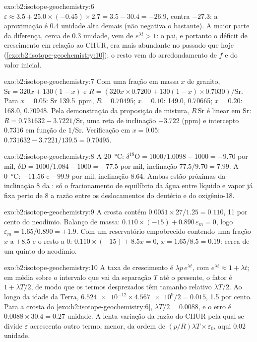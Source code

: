 \begin{solution}{exo:b2:isotope-geochemistry:6}
$\varepsilon \approx 3.5 + 25.0\times(-0.45)\times2.7 = 3.5 - 30.4 = -26.9$, contra
$-27.3$: a aproximação é 0.4 unidade alta demais (não negativa o bastante). A maior parte da
diferença, cerca de 0.3 unidade, vem de $e^{\lambda t} > 1$: o pai, e portanto o
déficit de crescimento em relação ao CHUR, era mais abundante no passado que hoje
(\cref{exo:b2:isotope-geochemistry:10}); o resto vem do arredondamento de $f$ e do valor inicial.
\end{solution}

\begin{solution}{exo:b2:isotope-geochemistry:7}
Com uma fração em massa $x$ de granito, $\mathrm{Sr} = 320x + 130(1-x)$ e
$R = (320x\times0.7200 + 130(1-x)\times0.7030)/\mathrm{Sr}$. Para $x = 0.05$: Sr
\qty{139.5}{ppm}, $R = 0.70495$; $x = 0.10$: 149.0, 0.70665; $x = 0.20$: 168.0,
0.70948. Pela demonstração da proposição de mistura, $R\,\mathrm{Sr}$ é linear em Sr:
$R = 0.731632 - 3.7221/\mathrm{Sr}$, uma reta de inclinação $-3.722$ (ppm) e
intercepto 0.7316 em função de $1/\mathrm{Sr}$. Verificação em $x = 0.05$: $0.731632 - 3.7221/139.5
= 0.70495$.
\end{solution}

\begin{solution}{exo:b2:isotope-geochemistry:8}
A \qty{20}{\degreeCelsius}: $\delta^{18}\mathrm{O} = 1000/1.0098 - 1000 = -9.70$ por
mil, $\delta\mathrm{D} = 1000/1.084 - 1000 = -77.5$ por mil, inclinação $77.5/9.70 = 7.99$.
A \qty{0}{\degreeCelsius}: $-11.56$ e $-99.9$ por mil, inclinação 8.64. Ambas estão próximas
da inclinação 8 da : só o fracionamento de equilíbrio da água
entre líquido e vapor já fixa perto de 8 a razão entre os deslocamentos do deutério e do
oxigênio-18.
\end{solution}

\begin{solution}{exo:b2:isotope-geochemistry:9}
A crosta contém $0.0051\times27/1.25 = 0.110$, 11 por cento do neodímio. Balanço
de massa: $0.110\times(-15) + 0.890\,\varepsilon_m = 0$, logo $\varepsilon_m = 1.65/0.890 =
+1.9$. Com um reservatório empobrecido contendo uma fração $x$ a $+8.5$ e o resto a 0:
$0.110\times(-15) + 8.5x = 0$, $x = 1.65/8.5 = 0.19$: cerca de um quinto do
neodímio.
\end{solution}

\begin{solution}{exo:b2:isotope-geochemistry:10}
A taxa de crescimento é $\lambda p\,e^{\lambda t}$, com $e^{\lambda t} \approx 1 + \lambda t$;
em média sobre o intervalo que vai da separação $T$ até o presente, o fator é
$1 + \lambda T/2$, de modo que os termos desprezados têm tamanho relativo $\lambda T/2$. Ao longo
da idade da Terra, $\num{6.524e-12}\times\num{4.567e9}/2 = 0.015$, 1.5 por cento. Para a
crosta do \cref{exo:b2:isotope-geochemistry:6}, $\lambda T/2 = 0.0088$, e o erro é $0.0088\times30.4 = 0.27$
unidade. A lenta variação da razão do CHUR pela qual se divide $\varepsilon$ acrescenta
outro termo, menor, da ordem de $(p/R)\lambda T \times \varepsilon_0$, aqui 0.02 unidade.
\end{solution}

